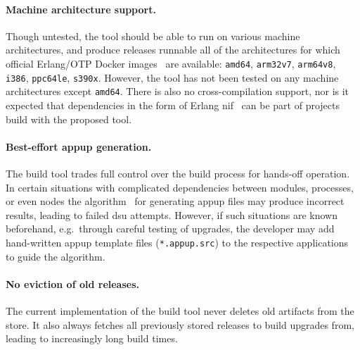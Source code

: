 \paragraph{Machine architecture support.} Though untested, the tool should be able to run on various machine architectures, and produce releases runnable all of the architectures for which official Erlang/OTP Docker images~\cite{docker:erlang} are available: \lstinline|amd64|, \lstinline|arm32v7|, \lstinline|arm64v8|, \lstinline|i386|, \lstinline|ppc64le|, \lstinline|s390x|. However, the tool has not been tested on any machine architectures except \lstinline|amd64|. There is also no cross-compilation support, nor is it expected that dependencies in the form of Erlang \acrfull{nif}~\cite{doc:otp} can be part of projects build with the proposed tool.

\paragraph{Best-effort \acrshort{appup} generation.} The build tool trades full control over the build process for hands-off operation. In certain situations with complicated dependencies between modules, processes, or even nodes the algorithm~\cite{rebar3appup}
for generating \acrfull{appup} files may produce incorrect results, leading to failed \acrshort{dsu} attempts. However, if such situations are known beforehand, e.g.~through careful testing of upgrades, the developer may add hand-written \acrshort{appup} template files (\lstinline|*.appup.src|) to the respective applications to guide the algorithm.

\paragraph{No eviction of old releases.} The current implementation of the build tool never deletes old artifacts from the store. It also always fetches all previously stored releases to build upgrades from, leading to increasingly long build times.
